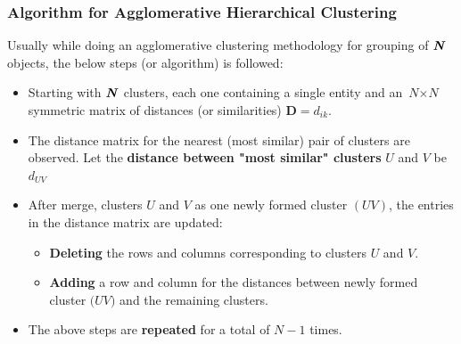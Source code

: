 \documentclass[10pt]{beamer} %
\begin{document}
\begin{frame}
   \frametitle{Algorithm for Agglomerative Hierarchical Clustering}
   Usually while doing an agglomerative clustering methodology for grouping of
   $\textbf{\textit{N}}$ objects, the below steps (or algorithm) is followed:
   \vspace{0.25cm}
   \begin{itemize}
      \item Starting with $\textbf{\textit{N}}$ clusters, each one containing a
         single entity and an $\textit{N} \times \textit{N}$ symmetric matrix of
         distances (or similarities) $\textbf{D} = {d_{ik}}$.
         \vspace{0.25cm}
      \item  The distance matrix for the nearest (most similar) pair of clusters
         are observed. Let the \textbf{distance between "most similar" clusters}
         $\textit{U}$ and $\textit{V}$ be $d_{UV}$
         \vspace{0.25cm}
      \item After merge, clusters $\textit{U}$ and $\textit{V}$ as one newly
         formed cluster $(\textit{UV})$, the entries in the distance matrix are
         updated:
         \vspace{0.25cm}
         \begin{itemize}
            \item \textbf{Deleting} the rows and columns corresponding to
               clusters $\textit{U}$ and $\textit{V}$.
               \vspace{0.25cm}
            \item \textbf{Adding} a row and column for the distances between
               newly formed cluster $\textit{(UV)}$ and the remaining clusters.
         \end{itemize} 
         \vspace{0.25cm}
      \item The above steps are \textbf{repeated} for a total of $N-1$ times.
   \end{itemize}
\end{frame}
\end{document}
